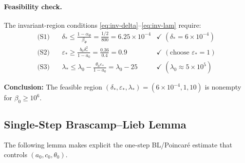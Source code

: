 \documentclass[11pt]{article}
\theoremstyle{definition}
\newcommand{\1}{\mathbf{1}}
\begin{document}
\paragraph{Feasibility check.}

The invariant-region conditions \eqref{eq:inv-delta}--\eqref{eq:inv-lam} require:
\begin{align}
\text{(S1)} &\quad \delta_* \le \frac{1-\alpha_\Phi}{\beta_\Phi} = \frac{1/2}{800} = 6.25 \times 10^{-4} 
& \checkmark\; (\delta_* = 6 \times 10^{-4}) \\
\text{(S2)} &\quad \varepsilon_* \ge \frac{b_0 \delta_*^2}{1-a_0} = \frac{0.36}{0.4} = 0.9 
& \checkmark\; (\text{choose } \varepsilon_* = 1) \\
\text{(S3)} &\quad \lambda_* \le \lambda_0 - \frac{\theta_0 \varepsilon_*}{1-a_0} = \lambda_0 - 25 
& \checkmark\; (\lambda_0 \approx 5 \times 10^5)
\end{align}

\textbf{Conclusion:} The feasible region $(\delta_*, \varepsilon_*, \lambda_*) = (6 \times 10^{-4}, 1, 10)$ 
is nonempty for $\beta_0 \ge 10^6$.

\subsection{Single-Step Brascamp--Lieb Lemma}

The following lemma makes explicit the one-step BL/Poincaré estimate that controls $(a_0, c_0, \theta_0)$.
\end{document}
